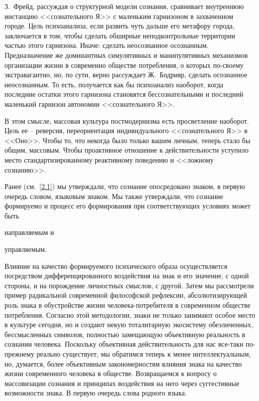 З.~Фрейд, рассуждая о структурной модели сознания, сравнивает внутреннюю
инстанцию <<сознательного Я>> с маленьким гарнизоном в захваченном городе.\autocite[][116]{freud1992}
Цель психоанализа, если развить чуть дальше его метафору города, заключается в том,
чтобы сделать обширные неподконтрольные территории частью этого гарнизона.
Иначе: сделать неосознанное осознанным. Предназначение же доминантных симулятивных
и манипулятивных механизмов организации жизни в современно обществе потребления, о
которых по-своему экстравагантно, но, по сути, верно рассуждает Ж.~Бодрияр, сделать
осознанное неосознанным. То есть, получается как бы психоанализ наоборот, когда
последние остатки этого гарнизона становятся бессознательными и последний маленький
гарнизон автономии <<сознательного Я>>.

В этом смысле, массовая культура постмодернизма есть просветление наоборот.
Цель ее -- реверсия, переориентация индивидуального <<сознательного Я>> в <<Оно>>.
Чтобы то, что некогда было только вашим личным, теперь стало бы общим, массовым.
Чтобы проактивное отношение к действительности уступило место стандартизированному
реактивному поведению и <<ложному сознанию>>.\autocite[][89]{eagleton1991ideology}

Ранее (см.~\ref{2.1}) мы утверждали, что сознание опосредовано знаком, в первую
очередь словом, языковым знаком. Мы также утверждали, что сознание формируемо и
процесс его формирования при соответствующих условиях может быть
\begin{enumerate*}[label=\asbuk*)]
    \item направляемым и
    \item управляемым.
\end{enumerate*}
Влияние на качество формируемого психического образа осуществляется
посредством дифференцированного воздействия на знак и его значение, с одной стороны,
и на порождение личностных смыслов, с другой. Затем мы рассмотрели пример
радикальной современной философской рефлексии, абсолютизирующей роль знака в
обустройстве жизни человека-потребителя в современном обществе потребления.
Согласно этой методологии, знаки не только занимают особое место в культуре
сегодня, но и создают некую тоталитарную экосистему обезличенных, бессмысленных
символов, полностью замещающую объективную реальность в сознании человека.
Поскольку объективная действительность для нас все-таки по-прежнему реально
существует, мы обратимся теперь к менее интеллектуальным, но, думается, более
объективным закономерностям влияния знака на качество жизни современного человека в
обществе. Возвращаемся к вопросу о массовизации сознания и принципах воздействия
на него через суггестивные возможности знака. В первую очередь слова родного языка.

